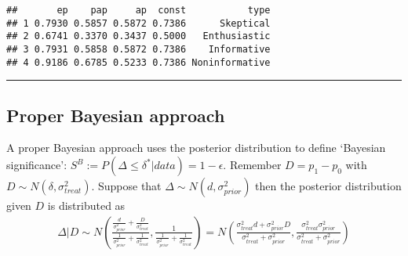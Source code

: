 \documentclass[
]{book}
\newenvironment{Shaded}{\begin{snugshade}}{\end{snugshade}}
\newcommand{\DecValTok}[1]{\textcolor[rgb]{0.00,0.00,0.81}{#1}}
\newcommand{\FunctionTok}[1]{\textcolor[rgb]{0.00,0.00,0.00}{#1}}
\newcommand{\NormalTok}[1]{#1}
\newcommand{\OtherTok}[1]{\textcolor[rgb]{0.56,0.35,0.01}{#1}}
\newcommand{\SpecialCharTok}[1]{\textcolor[rgb]{0.00,0.00,0.00}{#1}}
\begin{document}
\begin{Shaded}
\end{Shaded}

\begin{verbatim}
##       ep    pap     ap  const           type
## 1 0.7930 0.5857 0.5872 0.7386      Skeptical
## 2 0.6741 0.3370 0.3437 0.5000   Enthusiastic
## 3 0.7931 0.5858 0.5872 0.7386    Informative
## 4 0.9186 0.6785 0.5233 0.7386 Noninformative
\end{verbatim}

\begin{center}\rule{0.5\linewidth}{0.5pt}\end{center}

\hypertarget{proper-bayesian-approach}{%
\subsection{Proper Bayesian approach}\label{proper-bayesian-approach}}

A proper Bayesian approach uses the posterior distribution to define `Bayesian significance': \(S^B:=P(\Delta\leq\delta^*|data)=1-\epsilon\). Remember \(D=p_1-p_0\) with \(D \sim N(\delta, \sigma^2_{treat})\). Suppose that \(\Delta \sim N(d, \sigma^2_{prior})\) then the posterior distribution given \(D\) is distributed as
\[
\begin{aligned}
\Delta|D \sim N\left(\frac{\frac{d}{\sigma^2_{prior}}+\frac{D}{\sigma^2_{treat}}}{\frac{1}{\sigma^2_{prior}}+\frac{1}{\sigma^2_{treat}}}, \frac{1}{\frac{1}{\sigma^2_{prior}}+\frac{1}{\sigma^2_{treat}}}\right)=N\left( \frac{\sigma^2_{treat}d+\sigma^2_{prior}D}{\sigma^2_{treat}+\sigma^2_{prior}}, \frac{\sigma^2_{treat}\sigma^2_{prior}}{\sigma^2_{treat}+\sigma^2_{prior}}  \right)
\end{aligned}
\]
\end{document}
